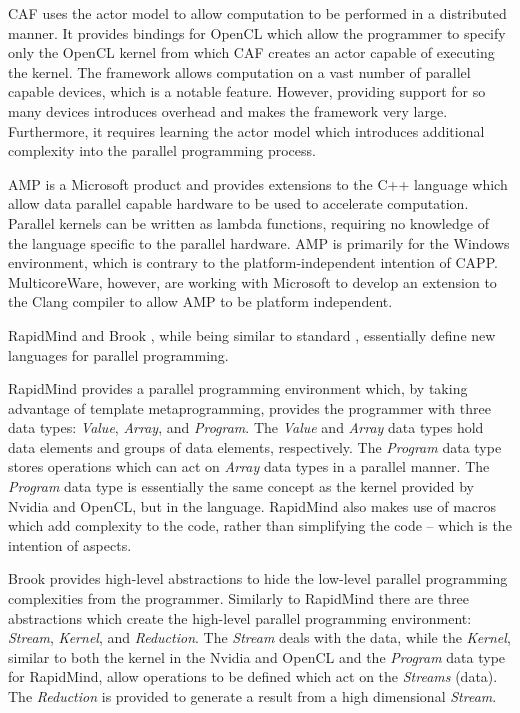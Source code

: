 \documentclass{sig-alternate-05-2015}
\begin{document}
CAF \cite{schmidt:actor, schmidt:actor1} uses the actor model to allow
computation to be performed in a distributed manner. It provides bindings for
OpenCL which allow the programmer to specify only the OpenCL kernel from which
CAF creates an actor capable of executing the kernel. The framework allows
computation on a vast number of parallel capable devices, which is a notable
feature. However, providing support for so many devices introduces overhead and makes 
the framework very large. Furthermore, it requires learning the actor model 
which introduces additional complexity into the parallel programming process.

\CPP AMP \cite{microsoft:amp} is a Microsoft product and provides extensions to the C++ language which allow 
data parallel capable hardware to be used to accelerate computation. Parallel kernels can be written as \CPP
lambda functions, requiring no knowledge of the language specific to the parallel hardware. \CPP AMP is
primarily for the Windows environment, which is contrary to the platform-independent intention of CAPP.
MulticoreWare, however, are working with Microsoft to develop an extension to the Clang compiler to allow \CPP
AMP to be platform independent.

RapidMind \cite{rapidmind} and Brook \cite{brook}, while being similar to standard
\CPP, essentially define new languages for parallel programming.

RapidMind provides a parallel programming environment which, by
taking advantage of \CPP template metaprogramming, provides the programmer 
with three data types: \textit{Value}, \textit{Array}, and \textit{Program}.
The \textit{Value} and \textit{Array} data types hold data elements and 
groups of data elements, respectively. The \textit{Program} data type stores
operations which can act on \textit{Array} data types in a parallel manner.
The \textit{Program} data type is essentially the same concept as the kernel 
provided  by Nvidia and OpenCL, but in the \CPP language. RapidMind also makes 
use of macros which add complexity to the code, rather than simplifying the code
-- which is the intention of aspects.

Brook provides high-level abstractions to hide the low-level parallel
programming complexities from the programmer. Similarly to RapidMind there 
are three abstractions which create the high-level parallel programming 
environment: \textit{Stream}, \textit{Kernel}, and \textit{Reduction}. The 
\textit{Stream} deals with the data, while the \textit{Kernel}, similar to both 
the kernel in the Nvidia and OpenCL and the \textit{Program} data type for 
RapidMind, allow operations to be defined which act on the \textit{Streams} (data). 
The \textit{Reduction} is provided to generate a result from a high dimensional 
\textit{Stream}.
\end{document}
